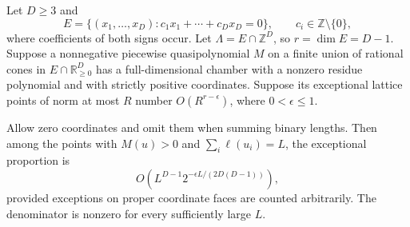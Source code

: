 \begin{lemma}
Let $D\ge3$ and
\[
 E=\{(x_1,\ldots,x_D):c_1x_1+\cdots+c_Dx_D=0\},
 \qquad c_i\in\mathbb Z\setminus\{0\},
\]
where coefficients of both signs occur.  Let $\Lambda=E\cap
\mathbb Z^D$, so $r=\dim E=D-1$.  Suppose a nonnegative
piecewise quasipolynomial $M$ on a finite union of rational
cones in $E\cap\mathbb R_{\ge0}^D$ has a full-dimensional
chamber with a nonzero residue polynomial and with strictly
positive coordinates.  Suppose its exceptional lattice
points of norm at most $R$ number $O(R^{r-\epsilon})$,
where $0<\epsilon\le1$.

Allow zero coordinates and omit them when summing binary
lengths.  Then among the points with $M(u)>0$ and
$\sum_i\ell(u_i)=L$, the exceptional proportion is
\[
        O\!\left(L^{D-1}2^{-\epsilon L/(2D(D-1))}\right),
 \tag{PNEW-raw-shell-bound}
\]
provided exceptions on proper coordinate faces are counted
arbitrarily.  The denominator is nonzero for every sufficiently
large $L$.
\end{lemma}
